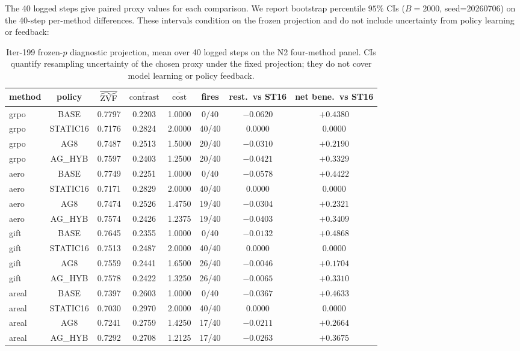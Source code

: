 The 40 logged steps give paired proxy values for each comparison. We report
bootstrap percentile $95\%$ CIs ($B=2000$, seed=20260706) on the 40-step
per-method differences. These intervals condition on the frozen projection and
do not include uncertainty from policy learning or feedback:

\begin{table}[ht]
\centering\small
\caption{Iter-199 frozen-$p$ diagnostic projection, mean over 40 logged steps
on the N2 four-method panel. CIs quantify resampling uncertainty of the chosen
proxy under the fixed projection; they do not cover model learning or policy
feedback.}
\label{tab:iter199-trajectory}
\vspace{2pt}
\begin{tabular}{l c c c c c c c}
\toprule
method & policy & $\overline{\widetilde{\mathrm{ZVF}}}$ & $\overline{\mathrm{contrast}}$ &
$\overline{\mathrm{cost}}$ & fires & rest.\ vs ST16 & net bene.\ vs ST16 \\
\midrule
grpo & BASE     & 0.7797 & 0.2203 & 1.0000 &  0/40 & $-0.0620$ & $+0.4380$ \\
grpo & STATIC16 & 0.7176 & 0.2824 & 2.0000 & 40/40 &  $0.0000$ &  $0.0000$ \\
grpo & AG8      & 0.7487 & 0.2513 & 1.5000 & 20/40 & $-0.0310$ & $\mathbf{+0.2190}$ \\
grpo & AG\_HYB  & 0.7597 & 0.2403 & 1.2500 & 20/40 & $-0.0421$ & $\mathbf{+0.3329}$ \\
\midrule
aero & BASE     & 0.7749 & 0.2251 & 1.0000 &  0/40 & $-0.0578$ & $+0.4422$ \\
aero & STATIC16 & 0.7171 & 0.2829 & 2.0000 & 40/40 &  $0.0000$ &  $0.0000$ \\
aero & AG8      & 0.7474 & 0.2526 & 1.4750 & 19/40 & $-0.0304$ & $\mathbf{+0.2321}$ \\
aero & AG\_HYB  & 0.7574 & 0.2426 & 1.2375 & 19/40 & $-0.0403$ & $\mathbf{+0.3409}$ \\
\midrule
gift & BASE     & 0.7645 & 0.2355 & 1.0000 &  0/40 & $-0.0132$ & $+0.4868$ \\
gift & STATIC16 & 0.7513 & 0.2487 & 2.0000 & 40/40 &  $0.0000$ &  $0.0000$ \\
gift & AG8      & 0.7559 & 0.2441 & 1.6500 & 26/40 & $-0.0046$ & $\mathbf{+0.1704}$ \\
gift & AG\_HYB  & 0.7578 & 0.2422 & 1.3250 & 26/40 & $-0.0065$ & $\mathbf{+0.3310}$ \\
\midrule
areal & BASE    & 0.7397 & 0.2603 & 1.0000 &  0/40 & $-0.0367$ & $+0.4633$ \\
areal & STATIC16 & 0.7030 & 0.2970 & 2.0000 & 40/40 &  $0.0000$ &  $0.0000$ \\
areal & AG8      & 0.7241 & 0.2759 & 1.4250 & 17/40 & $-0.0211$ & $\mathbf{+0.2664}$ \\
areal & AG\_HYB  & 0.7292 & 0.2708 & 1.2125 & 17/40 & $-0.0263$ & $\mathbf{+0.3675}$ \\
\bottomrule
\end{tabular}
\end{table}

